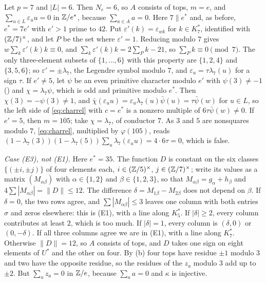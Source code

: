 Let $p=7$ and $|L|=6$. Then $N_{e}=6$, so $A$ consists of tops, $m=e$, and
$\sum_{u\in L}\varepsilon_{u}u=0$ in $\mathbb{Z}/e^{*}$, because $\sum_{a\in A}a=0$.
Here $7\parallel e^{*}$ and, as before, $e^{*}=7e'$ with $e'>1$ prime to $42$.
Put $\varepsilon'(k)=\varepsilon_{wk}$ for $k\in K^{*}_{7}$, identified with
$(\mathbb{Z}/7)^{\times}$, and let $P$ be the set where $\varepsilon'=1$. Reducing
modulo $7$ gives $w\sum_{k}\varepsilon'(k)k\equiv0$, and
$\sum_{k}\varepsilon'(k)k=2\sum_{P}k-21$, so $\sum_{P}k\equiv0\pmod7$. The
only three-element subsets of $\{1,\dots,6\}$ with this property are
$\{1,2,4\}$ and $\{3,5,6\}$; so $\varepsilon'=\pm\lambda_{7}$, the Legendre
symbol modulo $7$, and $\varepsilon_{u}=\tau\lambda_{7}(u)$ for a sign
$\tau$. If $e'\ne5$, let $\psi$ be an even primitive character modulo $e'$
with $\psi(3)\ne-1$ () and $\chi=\lambda_{7}\psi$, which is
odd and primitive modulo $e^{*}$. Then $\chi(3)=-\psi(3)\ne1$, and
$\bar\chi(\varepsilon_{u}u)=\varepsilon_{u}\lambda_{7}(u)\bar\psi(u)=
\tau\bar\psi(w)$ for $u\in L$, so the left side of \eqref{eq:charrel} with
$c=e^{*}$ is a nonzero multiple of $6\tau\bar\psi(w)\ne0$. If $e'=5$, then
$m=105$; take $\chi=\lambda_{7}$, of conductor $7$. As $3$ and $5$ are
nonsquares modulo $7$, \eqref{eq:charrel}, multiplied by $\varphi(105)$,
reads $(1-\lambda_{7}(3))(1-\lambda_{7}(5))\sum_{u}\lambda_{7}
(\varepsilon_{u}u)=4\cdot6\tau=0$, which is false.

\emph{Case (E3), not (E1).} Here $e^{*}=35$. The function $D$ is constant on
the six classes $\{(\pm i,\pm j)\}$ of four elements each, $i\in
(\mathbb{Z}/5)^{\times}$, $j\in(\mathbb{Z}/7)^{\times}$; write its values as a matrix
$(M_{\alpha\beta})$ with $\alpha\in\{1,2\}$ and $\beta\in\{1,2,3\}$, so that
$M_{\alpha\beta}=g_{\alpha}+h_{\beta}$ and $4\sum|M_{\alpha\beta}|=\|D\|\le
12$. The difference $\delta=M_{1\beta}-M_{2\beta}$ does not depend on
$\beta$. If $\delta=0$, the two rows agree, and $\sum|M_{\alpha\beta}|\le3$
leaves one column with both entries $\sigma$ and zeros elsewhere: this is
(E1), with a line along $K^{*}_{5}$. If $|\delta|\ge2$, every column
contributes at least $2$, which is too much. If $|\delta|=1$, every column is
$(\delta,0)$ or $(0,-\delta)$. If all three columns agree we are in (E1),
with a line along $K^{*}_{7}$. Otherwise $\|D\|=12$, so $A$ consists of
tops, and $D$ takes one sign on eight elements of $U^{*}$ and the other on
four. By (b) four tops have residue $\pm1$ modulo $3$ and two
have the opposite residue, so the residues of the $z_{a}$ modulo $3$ add up
to $\pm2$. But $\sum_{a}z_{a}=0$ in $\mathbb{Z}/e$, because $\sum_{a}a=0$ and
$\kappa$ is injective.

